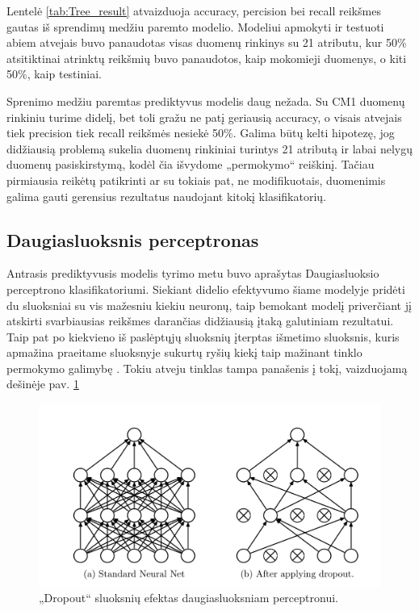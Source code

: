 \documentclass{VUMIFPSbakalaurinis}
\begin{document}
Lentelė \ref{tab:Tree_result} atvaizduoja accuracy, percision bei recall reikšmes gautas iš sprendimų medžiu paremto modelio. Modeliui apmokyti ir testuoti abiem atvejais buvo panaudotas visas duomenų rinkinys su 21 atributu, kur 50\% atsitiktinai atrinktų reikšmių buvo panaudotos, kaip mokomieji duomenys, o kiti 50\%, kaip testiniai.

Sprenimo medžiu paremtas prediktyvus modelis daug nežada. Su CM1 duomenų rinkiniu turime didelį, bet toli gražu ne patį geriausią accuracy, o visais atvejais tiek precision tiek recall reikšmės nesiekė 50\%. Galima būtų kelti hipotezę, jog didžiausią problemą sukelia duomenų rinkiniai turintys 21 atributą ir labai nelygų duomenų pasiskirstymą, kodėl čia išvydome „permokymo“ reiškinį. Tačiau pirmiausia reikėtų patikrinti ar su tokiais pat, ne modifikuotais, duomenimis galima gauti gerensius rezultatus naudojant kitokį klasifikatorių.

\subsection{Daugiasluoksnis perceptronas}
Antrasis prediktyvusis modelis tyrimo metu buvo aprašytas Daugiasluoksio perceptrono klasifikatoriumi. Siekiant didelio efektyvumo šiame modelyje pridėti du sluoksniai su vis mažesniu kiekiu neuronų, taip bemokant modelį priverčiant jį atskirti svarbiausias reikšmes darančias didžiausią įtaką galutiniam rezultatui. Taip pat po kiekvieno iš paslėptųjų sluoksnių įterptas išmetimo sluoksnis, kuris apmažina praeitame sluoksnyje sukurtų ryšių kiekį taip mažinant tinklo permokymo galimybę \cite{JMLR:v15:srivastava14a}. Tokiu atveju tinklas tampa panašenis į tokį, vaizduojamą dešinėje pav. \ref{img:dropout}

\begin{figure}[H]
    \centering
    \includegraphics[scale=0.5]{img/dropout}
    \caption{„Dropout“ sluoksnių efektas daugiasluoksniam perceptronui.}
    \label{img:dropout}
\end{figure}
\end{document}
